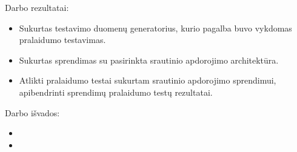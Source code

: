 \documentclass{VUMIFPSkursinis}
\begin{document}


Darbo rezultatai:
\begin{itemize}
    \item Sukurtas testavimo duomenų generatorius, kurio pagalba buvo vykdomas pralaidumo testavimas.
    \item Sukurtas sprendimas su pasirinkta srautinio apdorojimo architektūra.
    \item Atlikti pralaidumo testai sukurtam srautinio apdorojimo sprendimui, apibendrinti sprendimų pralaidumo testų rezultatai.
\end{itemize}

Darbo išvados:
\begin{itemize}
\item 
\item
\end{itemize}

\printbibliography[heading=bibintoc] 
\end{document}
